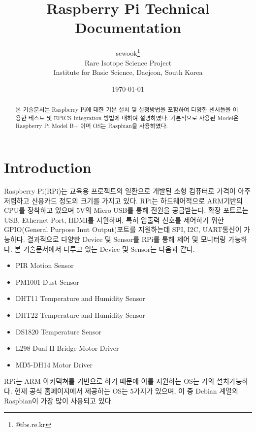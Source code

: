 \documentclass[11pt
  , a4paper
  , article
  , oneside
]{memoir}
\begin{document}
\newcommand{\technumber}{
  RAON Control-Document Series\\
  Revision : v1.0,   Release : a fixed date}
\title{\textbf{Raspberry Pi Technical Documentation}}

\author{scwook\thanks{@ibs.re.kr} \\

  Rare Isotope Science Project\\
  Institute for Basic Science, Daejeon, South Korea
}
\date{\today}

\renewcommand{\maketitlehooka}{\begin{flushright}\textsf{\technumber}\end{flushright}}

\maketitle

\begin{abstract}
본 기술문서는 Raspberry Pi에 대한 기본 설치 및 설정방법을 포함하여 다양한 센서들을 이용한 테스트 및 
EPICS Integration 방법에 대하여 설명하였다. 기본적으로 사용된 Model은 Raspberry Pi Model B+ 이며  
OS는 Raspbian을 사용하였다. \citep{FAI}
\end{abstract}

\chapter{Introduction}
Raspberry Pi(RPi)는 교육용 프로젝트의 일환으로 개발된 소형 컴퓨터로 가격이 아주 저렴하고 신용카드 정도의
크기를 가지고 있다. RPi는 하드웨어적으로 ARM기반의 CPU를 장착하고 있으며 5V의 Micro USB를 통해 전원을 
공급받는다. 확장 포트로는 USB, Ethernet Port, HDMI를 지원하며, 특히 입출력 신호를 제어하기 위한 
GPIO(General Purpose Inut Output)포트를 지원하는데 SPI, I2C, UART통신이 가능하다. 결과적으로 다양한
Device 및 Sensor를 RPi를 통해 제어 및 모니터링 가능하다. 본 기술문서에서 다루고 있는 Device 및 Sensor는
다음과 같다.
\begin{itemize}
\item PIR Motion Sensor
\item PM1001 Dust Sensor
\item DHT11 Temperature and Humidity Sensor
\item DHT22 Temperature and Humidity Sensor
\item DS1820 Temperature Sensor
\item L298 Dual H-Bridge Motor Driver
\item MD5-DH14 Motor Driver
\end{itemize}
RPi는 ARM 아키텍쳐를 기반으로 하기 때문에 이를 지원하는 OS는 거의 설치가능하다. 현재 공식 홈페이지에서
제공하는 OS는 5가지가 있으며, 이 중 Debian 계열의 Raspbian이 가장 많이 사용되고 있다.
\end{document}
